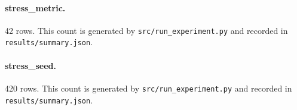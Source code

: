 \documentclass{article}
\begin{document}
\paragraph{stress\_metric.} 42 rows. This count is generated by \texttt{src/run\_experiment.py} and recorded in \texttt{results/summary.json}.
\paragraph{stress\_seed.} 420 rows. This count is generated by \texttt{src/run\_experiment.py} and recorded in \texttt{results/summary.json}.
\begingroup
\raggedright


\endgroup
\end{document}

